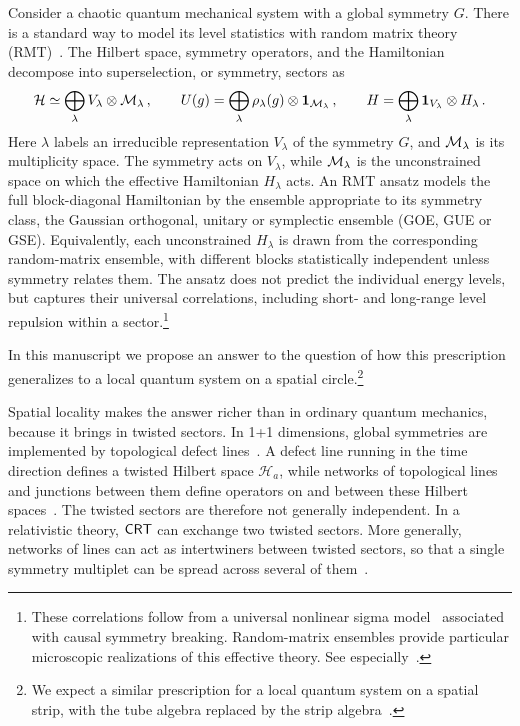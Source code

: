 \documentclass[11pt]{article}
\numberwithin{equation}{section}
\begin{document}
Consider a chaotic quantum mechanical system with a global symmetry $G$. There is a standard way to model its level statistics with random matrix theory (RMT)~\cite{Dyson:1962es,Dyson:1962eeu,Bohigas:1983er,Mehta:2004}. The Hilbert space, symmetry operators, and the Hamiltonian decompose into superselection, or symmetry, sectors as
\begin{equation}
\label{E:theStart}
    \mathcal{H}
    \simeq
    \bigoplus_{\lambda} V_{\lambda}\otimes \mathcal{M}_{\lambda}\,,
    \qquad
    U(g)
    =
    \bigoplus_{\lambda}
    \rho_{\lambda}(g)\otimes\mathbf{1}_{\mathcal{M}_{\lambda}}\,,
    \qquad
    H
    =
\bigoplus_{\lambda}
\mathbf{1}_{V_{\lambda}}\otimes H_{\lambda}\,.
\end{equation}
Here $\lambda$ labels an irreducible representation $V_{\lambda}$ of the symmetry $G$, and $\mathcal{M}_{\lambda}$ is its multiplicity space. The symmetry acts on $V_{\lambda}$, while $\mathcal{M}_{\lambda}$ is the unconstrained space on which the effective Hamiltonian $H_{\lambda}$ acts. An RMT ansatz models the full block-diagonal Hamiltonian by the ensemble appropriate to its symmetry class, the Gaussian orthogonal, unitary or symplectic ensemble (GOE, GUE or GSE). Equivalently, each unconstrained $H_{\lambda}$ is drawn from the corresponding random-matrix ensemble, with different blocks statistically independent unless symmetry relates them. The ansatz does not predict the individual energy levels, but captures their universal correlations, including short- and long-range level repulsion within a sector.\footnote{These correlations follow from a universal nonlinear sigma model~\cite{Efetov:1983xg,Andreev:1996tw} associated with causal symmetry breaking. Random-matrix ensembles provide particular microscopic realizations of this effective theory. See especially~\cite{Altland:2020ccq,Altland:2021rqn}.}

In this manuscript we propose an answer to the question of how this prescription generalizes to a local quantum system on a spatial circle.\footnote{We expect a similar prescription for a local quantum system on a spatial strip, with the tube algebra replaced by the strip algebra~\cite{Cordova:2024iti}.}

Spatial locality makes the answer richer than in ordinary quantum mechanics, because it brings in twisted sectors. In 1+1 dimensions, global symmetries are implemented by topological defect lines~\cite{Frohlich:2004ef,Gaiotto:2014kfa,Bhardwaj:2017xup,Chang:2018iay}. A defect line running in the time direction defines a twisted Hilbert space $\mathcal{H}_a$, while networks of topological lines and junctions between them define operators on and between these Hilbert spaces~\cite{Petkova:2000ip,Chang:2018iay,Lin:2022dhv}. The twisted sectors are therefore not generally independent. In a relativistic theory, $\mathsf{CRT}$ can exchange two twisted sectors. More generally, networks of lines can act as intertwiners between twisted sectors, so that a single symmetry multiplet can be spread across several of them~\cite{Lin:2022dhv,Bartsch:2023wvv,Choi:2024tri}. 
\end{document}
